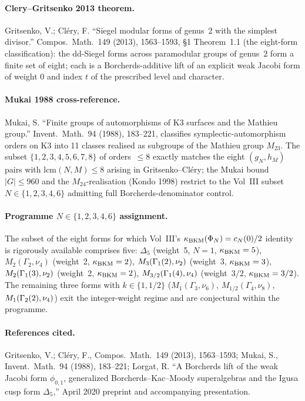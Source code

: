 \paragraph{Clery--Gritsenko 2013 theorem.}
\ClaimStatusTheorem{} Gritsenko, V.; Cl\'ery, F. ``Siegel modular forms
of genus~$2$ with the simplest divisor.'' Compos.\ Math.\ 149 (2013),
1563--1593, \S1 Theorem~1.1 (the eight-form classification): the
dd-Siegel forms across paramodular groups of genus~$2$ form a finite
set of eight; each is a Borcherds-additive lift of an explicit weak
Jacobi form of weight $0$ and index $t$ of the prescribed level and
character.

\paragraph{Mukai 1988 cross-reference.}
\ClaimStatusTheorem{} Mukai, S. ``Finite groups of automorphisms of K3
surfaces and the Mathieu group.'' Invent.\ Math.\ 94 (1988), 183--221,
classifies symplectic-automorphism orders on K3 into 11 classes
realised as subgroups of the Mathieu group $M_{23}$. The subset
$\{1, 2, 3, 4, 5, 6, 7, 8\}$ of orders~$\leq 8$ exactly matches the
eight $(g_N, h_M)$ pairs with $\mathrm{lcm}(N, M) \leq 8$ arising in
Gritsenko--Cl\'ery; the Mukai bound $|G| \leq 960$ and the
$M_{24}$-realisation (Kondo 1998) restrict to the Vol~III subset
$N \in \{1, 2, 3, 4, 6\}$ admitting full Borcherds-denominator control.

\paragraph{Programme $N \in \{1,2,3,4,6\}$ assignment.}
The subset of the eight forms for which Vol~III's
$\kappa_{\mathrm{BKM}}(\Phi_N) = c_N(0)/2$ identity is rigorously available comprises
five: $\Delta_5$ (weight~5, $N=1$, $\kappa_{\mathrm{BKM}}=5$),
$M_2(\Gamma_2,\nu_4)$ (weight~2, $\kappa_{\mathrm{BKM}}=2$),
$M_3(\Gamma_{1}(2),\nu_2)$ (weight~3, $\kappa_{\mathrm{BKM}}=3$),
$M_2(\Gamma_{1}(3),\nu_2)$ (weight~2, $\kappa_{\mathrm{BKM}}=2$),
$M_{3/2}(\Gamma_{1}(4),\nu_4)$ (weight~$3/2$, $\kappa_{\mathrm{BKM}} = 3/2$). The
remaining three forms with $k \in \{1, 1/2\}$ ($M_1(\Gamma_3, \nu_6)$,
$M_{1/2}(\Gamma_4, \nu_8)$, $M_1(\Gamma_{2}(2), \nu_4)$) exit the
integer-weight regime and are conjectural within the programme.

\paragraph{References cited.}
Gritsenko, V.; Cl\'ery, F., Compos.\ Math.\ 149 (2013), 1563--1593;
Mukai, S., Invent.\ Math.\ 94 (1988), 183--221; Lorgat, R.
``A Borcherds lift of the weak Jacobi form $\phi_{0,1}$, generalized
Borcherds--Kac--Moody superalgebras and the Igusa cusp form $\Delta_5$,''
April 2020 preprint and accompanying presentation.
